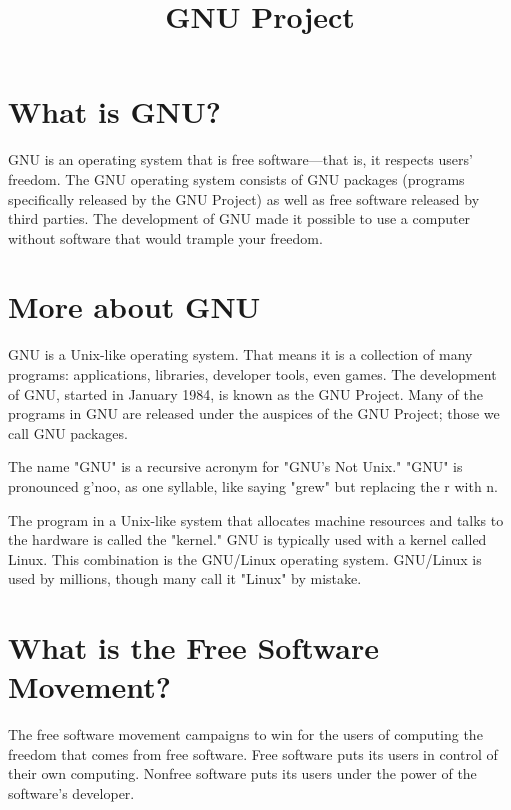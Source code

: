 \documentclass[12pt,a4paper]{article}
\title{GNU Project}
\author{}
\date{}
\begin{document}
	
	\maketitle
	
	\section{What is GNU?}
	GNU is an operating system that is free software—that is, it respects users' freedom. The GNU operating system consists of GNU packages (programs specifically released by the GNU Project) as well as free software released by third parties. The development of GNU made it possible to use a computer without software that would trample your freedom.
	
	\section{More about GNU}
	GNU is a Unix-like operating system. That means it is a collection of many programs: applications, libraries, developer tools, even games. The development of GNU, started in January 1984, is known as the GNU Project. Many of the programs in GNU are released under the auspices of the GNU Project; those we call GNU packages.
	
	The name "GNU" is a recursive acronym for "GNU's Not Unix." "GNU" is pronounced g'noo, as one syllable, like saying "grew" but replacing the r with n.
	
	The program in a Unix-like system that allocates machine resources and talks to the hardware is called the "kernel." GNU is typically used with a kernel called Linux. This combination is the GNU/Linux operating system. GNU/Linux is used by millions, though many call it "Linux" by mistake.
	
	\section{What is the Free Software Movement?}
	The free software movement campaigns to win for the users of computing the freedom that comes from free software. Free software puts its users in control of their own computing. Nonfree software puts its users under the power of the software's developer.
	
\end{document}
